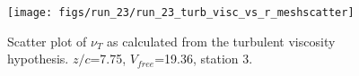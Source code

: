 \begin{figure}[H]
\centering
\texttt{[image: figs/run\_23/run\_23\_turb\_visc\_vs\_r\_meshscatter]}
\caption{Scatter plot of $\nu_T$ as calculated from the turbulent viscosity hypothesis. $z/c$=7.75, $V_{free}$=19.36, station 3.}
\label{fig:run_23_turb_visc_vs_r_meshscatter}
\end{figure}


